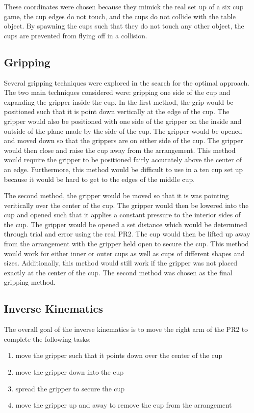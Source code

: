 \documentclass[letterpaper, 10 pt, conference]{ieeeconf}  %
\begin{document}
These coordinates were chosen because they mimick the real set up of a six cup game, the cup edges do not touch, and the cups do not collide with the table object. By spawning the cups such that they do not touch any other object, the cups are prevented from flying off in a collision.

\subsection{Gripping}
Several gripping techniques were explored in the search for the optimal approach. The two main techniques considered were: gripping one side of the cup and expanding the gripper inside the cup. In the first method, the grip would be positioned such that it is point down vertically at the edge of the cup. The gripper would also be positioned with one side of the gripper on the inside and outside of the plane made by the side of the cup. The gripper would be opened and moved down so that the grippers are on either side of the cup. The gripper would then close and raise the cup away from the arrangement. This method would require the gripper to be positioned fairly accurately above the center of an edge. Furthermore, this method would be difficult to use in a ten cup set up because it would be hard to get to the edges of the middle cup. 

The second method, the gripper would be moved so that it is was pointing veritically over the center of the cup. The gripper would then be lowered into the cup and opened such that it applies a constant pressure to the interior sides of the cup. The gripper would be opened a set distance which would be determined through trial and error using the real PR2. The cup would then be lifted up away from the arrangement with the gripper held open to secure the cup. This method would work for either inner or outer cups as well as cups of different shapes and sizes. Additionally, this method would still work if the gripper was not placed exactly at the center of the cup. The second method was chosen as the final gripping method.

\subsection{Inverse Kinematics}

The overall goal of the inverse kinematics is to move the right arm of the PR2 to complete the following tasks:
\begin{enumerate}
\item move the gripper such that it points down over the center of the cup
\item move the gripper down into the cup 
\item spread the gripper to secure the cup
\item move the gripper up and away to remove the cup from the arrangement
\end{enumerate}
\end{document}

